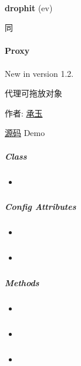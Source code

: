 \documentclass[letterpaper,10pt,english]{sphinxmanual}
\begin{document}

\begin{fulllineitems}
\label{api/component/dd/droppable-delegate:DroppableDelegate.drophit}~
\begin{DUlineblock}{0em}
\item[] \textbf{drophit} (ev)
\item[] 同 {\hyperref[api/component/dd/droppable:Droppable.drophit]{}}
\end{DUlineblock}

\end{fulllineitems}

\label{api/component/dd/proxy:module-Proxy}

\paragraph{Proxy}
\label{api/component/dd/proxy::doc}\label{api/component/dd/proxy:proxy}New in version 1.2.
\begin{DUlineblock}{0em}
\item[] 代理可拖放对象
\item[] 作者: \href{mailto:chengyu@taobao.com}{承玉}
\item[] \href{https://github.com/kissyteam/kissy/tree/master/src/dd/proxy.js}{源码}  \textbar{} Demo
\end{DUlineblock}


\subparagraph{Class}
\label{api/component/dd/proxy:class}\begin{itemize}
\item {}
{\hyperref[api/component/dd/proxy:Proxy.Proxy]{}}

\end{itemize}


\subparagraph{Config Attributes}
\label{api/component/dd/proxy:config-attributes}\begin{itemize}
\item {}
{\hyperref[api/component/dd/proxy:Proxy.node]{}}

\item {}
{\hyperref[api/component/dd/proxy:Proxy.destroyOnEnd]{}}

\end{itemize}


\subparagraph{Methods}
\label{api/component/dd/proxy:methods}\begin{itemize}
\item {}
{\hyperref[api/component/dd/proxy:Proxy.attach]{}}

\item {}
{\hyperref[api/component/dd/proxy:Proxy.unAttach]{}}

\item {}
{\hyperref[api/component/dd/proxy:Proxy.destroy]{}}

\end{itemize}
\end{document}

